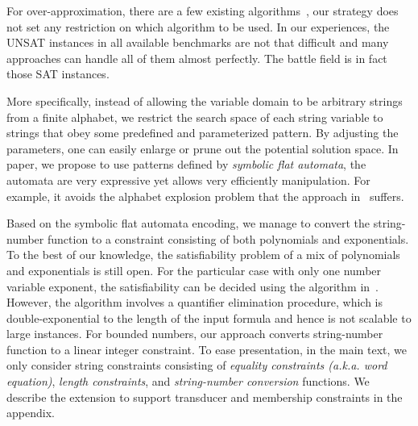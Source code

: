 \documentclass{llncs}
\begin{document}
For over-approximation, there are a few existing algorithms~\cite{atva2019,z3}, our strategy does not set any restriction on which algorithm to be used. In our experiences, the UNSAT instances in all available benchmarks are not that difficult and many approaches can handle all of them almost perfectly. The battle field is in fact those SAT instances. 










More specifically, instead of allowing the variable domain to be arbitrary strings from a finite alphabet, we restrict the search space of each string variable to strings that obey some predefined and parameterized pattern. By adjusting the parameters, one can easily enlarge or prune out the potential solution space. In paper, we propose to use patterns defined by \emph{symbolic flat automata}, the automata are very expressive yet allows very efficiently manipulation. For example, it avoids the alphabet 
explosion problem that the approach in~\cite{PLDI2017} suffers.


Based on the symbolic flat automata encoding, we manage to convert the 
string-number function to a constraint consisting of both 
polynomials and exponentials. To the best of our knowledge, the satisfiability 
problem of a mix of polynomials and exponentials is still open. For the 
particular case with only one number variable exponent, the satisfiability can 
be decided using the algorithm in~\cite{POPL2019}. However, the algorithm involves a quantifier elimination procedure, which is double-exponential to the length of the input formula and hence is not scalable to large instances.   For bounded numbers, our approach converts string-number function to a linear integer constraint.
To ease presentation, in the main text, we only consider string constraints consisting of \emph{equality constraints (a.k.a. word equation)}, \emph{length constraints}, and \emph{string-number conversion} functions. We describe the extension to support transducer and membership constraints in the appendix. 
\end{document}
